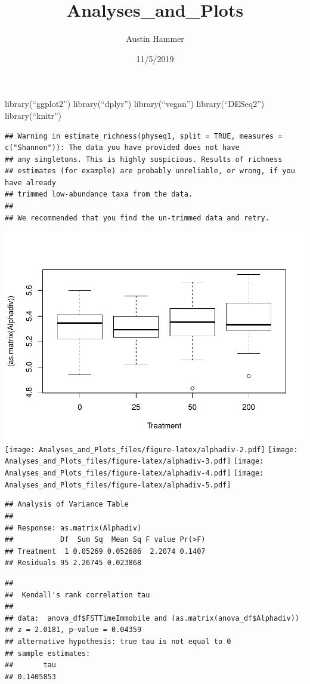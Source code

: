 \documentclass[]{article}
\title{Analyses\_and\_Plots}
\author{Austin Hammer}
\date{11/5/2019}
\begin{document}
\maketitle

library(``ggplot2'') library(``dplyr'') library(``vegan'')
library(``DESeq2'') library(``knitr'')

\begin{verbatim}
## Warning in estimate_richness(physeq1, split = TRUE, measures = c("Shannon")): The data you have provided does not have
## any singletons. This is highly suspicious. Results of richness
## estimates (for example) are probably unreliable, or wrong, if you have already
## trimmed low-abundance taxa from the data.
## 
## We recommended that you find the un-trimmed data and retry.
\end{verbatim}

\includegraphics{Analyses_and_Plots_files/figure-latex/alphadiv-1.pdf}
\texttt{[image: Analyses\_and\_Plots\_files/figure-latex/alphadiv-2.pdf]}
\texttt{[image: Analyses\_and\_Plots\_files/figure-latex/alphadiv-3.pdf]}
\texttt{[image: Analyses\_and\_Plots\_files/figure-latex/alphadiv-4.pdf]}
\texttt{[image: Analyses\_and\_Plots\_files/figure-latex/alphadiv-5.pdf]}

\begin{verbatim}
## Analysis of Variance Table
## 
## Response: as.matrix(Alphadiv)
##           Df  Sum Sq  Mean Sq F value Pr(>F)
## Treatment  1 0.05269 0.052686  2.2074 0.1407
## Residuals 95 2.26745 0.023868
\end{verbatim}

\begin{verbatim}
## 
##  Kendall's rank correlation tau
## 
## data:  anova_df$FSTTimeImmobile and (as.matrix(anova_df$Alphadiv))
## z = 2.0181, p-value = 0.04359
## alternative hypothesis: true tau is not equal to 0
## sample estimates:
##       tau 
## 0.1405853
\end{verbatim}
\end{document}
